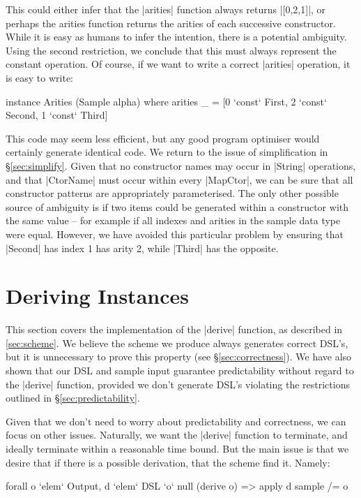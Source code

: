 \documentclass[preprint]{sigplanconf}
\begin{document}
This could either infer that the |arities| function always returns |[0,2,1]|, or perhaps the arities function returns the arities of each successive constructor. While it is easy as humans to infer the intention, there is a potential ambiguity. Using the second restriction, we conclude that this must always represent the constant operation. Of course, if we want to write a correct |arities| operation, it is easy to write:

\begin{code}
instance Arities (Sample alpha) where
    arities _ = [0 `const` First{}, 2 `const` Second{}, 1 `const` Third{}]
\end{code}

This code may seem less efficient, but any good program optimiser would certainly generate identical code. We return to the issue of simplification in \S\ref{sec:simplify}. Given that no constructor names may occur in |String| operations, and that |CtorName| must occur within every |MapCtor|, we can be sure that all constructor patterns are appropriately parameterised. The only other possible source of ambiguity is if two items could be generated within a constructor with the same value -- for example if all indexes and arities in the sample data type were equal. However, we have avoided this particular problem by ensuring that |Second| has index 1 has arity 2, while |Third| has the opposite.

\section{Deriving Instances}
\label{sec:guess}

This section covers the implementation of the |derive| function, as described in \ref{sec:scheme}. We believe the scheme we produce always generates correct DSL's, but it is unnecessary to prove this property (see \S\ref{sec:correctness}). We have also shown that our DSL and sample input guarantee predictability without regard to the |derive| function, provided we don't generate DSL's violating the restrictions outlined in \S\ref{sec:predictability}.

Given that we don't need to worry about predictability and correctness, we can focus on other issues. Naturally, we want the |derive| function to terminate, and ideally terminate within a reasonable time bound. But the main issue is that we desire that if there is a possible derivation, that the scheme find it. Namely:

\ignore\begin{code}
forall o `elem` Output, d `elem` DSL `o` null (derive o) => apply d sample /= o
\end{code}
\end{document}
